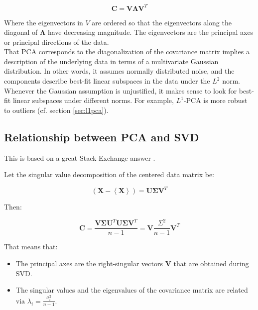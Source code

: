 \begin{equation}
\mathbf{C} = \mathbf{V}\mathbf{\Lambda}\mathbf{V}^T
\end{equation}

Where the eigenvectors in $V$ are ordered so that the eigenvectors along the diagonal of $\mathbf{\Lambda}$ have decreasing magnitude. The eigenvectors are the principal axes or principal directions of the data.
\\
That PCA corresponds to the diagonalization of the covariance matrix implies a description of the underlying data in terms of a multivariate Gaussian distribution. In other words, it assumes normally distributed noise, and the components describe best-fit linear subspaces in the data under the $L^2$ norm. Whenever the Gaussian assumption is unjustified, it makes sense to look for best-fit linear subspaces under different norms. For example, $L^1$-PCA is more robust to outliers (cf. section \ref{sec:l1pca}). 


\subsection{Relationship between PCA and SVD}
\label{sec:pcasvd}
This is based on a great Stack Exchange answer \cite{amoeba2015svdpca}.

Let the singular value decomposition of the centered data matrix be:

\begin{equation}
\left(\mathbf{X}-\left<\mathbf{X}\right>\right) = \mathbf{U}\mathbf{\Sigma}\mathbf{V}^T
\end{equation}

Then:

\begin{equation}
\mathbf{C} = \frac{\mathbf{V\Sigma U}^T\mathbf{U\Sigma V}^T}{n-1} = \mathbf{V}\frac{\Sigma^2}{n-1}\mathbf{V}^T
\end{equation}

That means that:

\begin{itemize}
\item The principal axes are the right-singular vectors $\mathbf{V}$ that are obtained during SVD.
\item The singular values and the eigenvalues of the covariance matrix are related via $\lambda_i = \frac{\sigma_i^2}{n-1}$.
\end{itemize}




